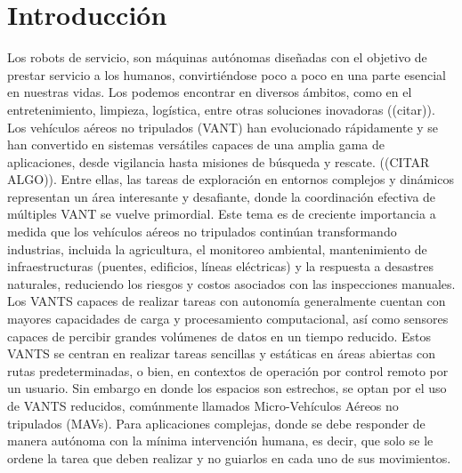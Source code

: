 \documentclass[sigconf]{acmart}
\begin{document}

\maketitle

\section{Introducción}

Los robots de servicio, son máquinas autónomas diseñadas con el objetivo de prestar servicio a los humanos, convirtiéndose poco a poco en una parte esencial en nuestras vidas. Los podemos encontrar en diversos ámbitos, como en el entretenimiento, limpieza, logística, entre otras soluciones inovadoras ((citar)).\\

Los vehículos aéreos no tripulados (VANT) han evolucionado rápidamente y se han convertido en sistemas versátiles capaces de una amplia gama de aplicaciones, desde vigilancia hasta misiones de búsqueda y rescate. ((CITAR ALGO)). Entre ellas, las tareas de exploración en entornos complejos y dinámicos representan un área interesante y desafiante, donde la coordinación efectiva de múltiples VANT se vuelve primordial. Este tema es de creciente importancia a medida que los vehículos aéreos no tripulados continúan transformando industrias, incluida la agricultura, el monitoreo ambiental, mantenimiento de infraestructuras (puentes, edificios, líneas eléctricas) y la respuesta a desastres naturales, reduciendo los riesgos y costos asociados con las inspecciones manuales.\\

Los VANTS capaces de realizar tareas con autonomía generalmente cuentan con mayores capacidades de carga y procesamiento computacional, así como sensores capaces de percibir grandes volúmenes de datos en un tiempo reducido. Estos VANTS se centran en realizar tareas sencillas y estáticas en áreas abiertas con rutas predeterminadas, o bien, en contextos de operación por control remoto por un usuario. Sin embargo en donde los espacios son estrechos, se optan por el uso de VANTS reducidos, comúnmente llamados Micro-Vehículos Aéreos no tripulados (MAVs). Para aplicaciones complejas, donde se debe responder de manera autónoma con la mínima intervención humana, es decir, que solo se le ordene la tarea que deben realizar y no guiarlos en cada uno de sus movimientos.\\
\end{document}
